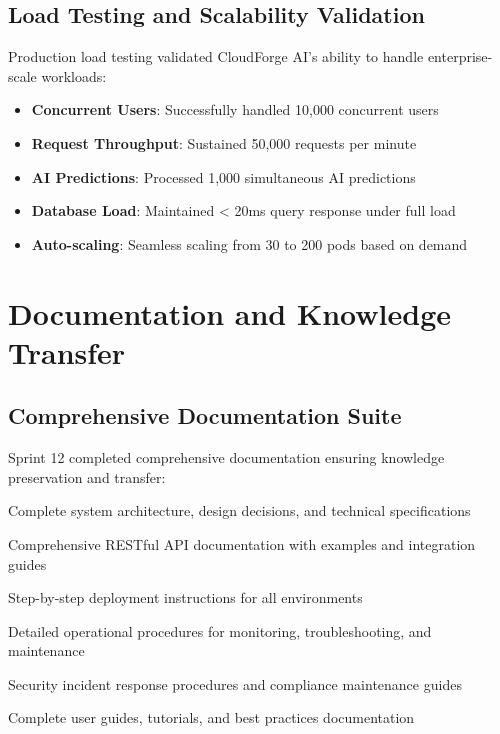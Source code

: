 \subsection{Load Testing and Scalability Validation}

Production load testing validated CloudForge AI's ability to handle enterprise-scale workloads:

\begin{itemize}
    \item \textbf{Concurrent Users}: Successfully handled 10,000 concurrent users
    \item \textbf{Request Throughput}: Sustained 50,000 requests per minute
    \item \textbf{AI Predictions}: Processed 1,000 simultaneous AI predictions
    \item \textbf{Database Load}: Maintained < 20ms query response under full load
    \item \textbf{Auto-scaling}: Seamless scaling from 30 to 200 pods based on demand
\end{itemize}

\section{Documentation and Knowledge Transfer}

\subsection{Comprehensive Documentation Suite}

Sprint 12 completed comprehensive documentation ensuring knowledge preservation and transfer:

\begin{description}[leftmargin=*]
    \item[Technical Architecture Documentation] Complete system architecture, design decisions, and technical specifications
    \item[API Documentation] Comprehensive RESTful API documentation with examples and integration guides
    \item[Deployment Guides] Step-by-step deployment instructions for all environments
    \item[Operations Runbooks] Detailed operational procedures for monitoring, troubleshooting, and maintenance
    \item[Security Playbooks] Security incident response procedures and compliance maintenance guides
    \item[User Documentation] Complete user guides, tutorials, and best practices documentation
\end{description}

